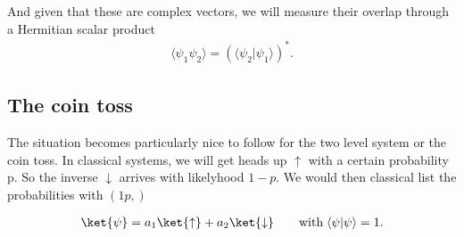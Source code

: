 And given that these are complex vectors, we will measure their overlap through a Hermitian scalar product
\begin{align}
				\langle\psi_1 \psi_2\rangle=(\langle{\psi_2}| \psi_1\rangle)^*.
\end{align}
\subsection{The coin toss}
The situation becomes particularly nice to follow for the two level system or the coin toss. In classical systems, we will get heads up $\uparrow$ with a certain probability p. So the inverse $\downarrow$ arrives with likelyhood $1-p$. We would then classical list the probabilities with $(1p, )$ 

\begin{align}
	\ket{\psi} = a_1 \ket{\uparrow} + a_2 \ket{\downarrow}  \qquad \text{with} \; \langle\psi | \psi\rangle = 1.
\end{align}